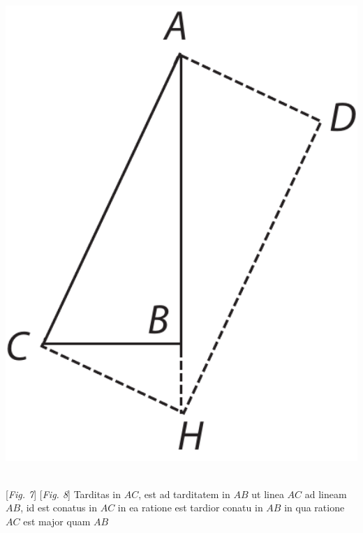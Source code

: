 \begin{minipage}[t]{0.26\textwidth}
\hspace*{-5mm}
\includegraphics[trim = 0mm -3mm 0mm 0mm, clip, width=1.0\textwidth]{images/LH035,14,02_114r-d8.pdf}
\end{minipage}\\
\hspace*{29mm} [\textit{Fig. 7}]\hspace*{51mm} [\textit{Fig. 8}]
\pend
\vspace{2.5em}
\pstart
Tarditas\protect{} in $\displaystyle AC$, est ad tarditatem in $\displaystyle AB$
ut linea $\displaystyle AC$ ad lineam $\displaystyle AB$,
id est conatus\protect{} in $\displaystyle AC$ in ea ratione est tardior conatu in $\displaystyle AB$
in qua ratione $\displaystyle AC$ est major quam $\displaystyle AB$
